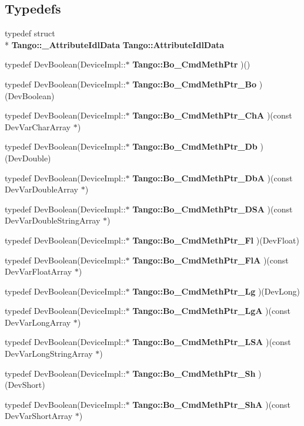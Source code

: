 \subsection*{Typedefs}
\begin{DoxyCompactItemize}
\item 
typedef struct \\*
{\bf Tango\-::\-\_\-\-Attribute\-Idl\-Data} {\bf Tango\-::\-Attribute\-Idl\-Data}
\item 
typedef Dev\-Boolean(Device\-Impl\-::$\ast$ {\bf Tango\-::\-Bo\-\_\-\-Cmd\-Meth\-Ptr} )()
\item 
typedef Dev\-Boolean(Device\-Impl\-::$\ast$ {\bf Tango\-::\-Bo\-\_\-\-Cmd\-Meth\-Ptr\-\_\-\-Bo} )(Dev\-Boolean)
\item 
typedef Dev\-Boolean(Device\-Impl\-::$\ast$ {\bf Tango\-::\-Bo\-\_\-\-Cmd\-Meth\-Ptr\-\_\-\-Ch\-A} )(const Dev\-Var\-Char\-Array $\ast$)
\item 
typedef Dev\-Boolean(Device\-Impl\-::$\ast$ {\bf Tango\-::\-Bo\-\_\-\-Cmd\-Meth\-Ptr\-\_\-\-Db} )(Dev\-Double)
\item 
typedef Dev\-Boolean(Device\-Impl\-::$\ast$ {\bf Tango\-::\-Bo\-\_\-\-Cmd\-Meth\-Ptr\-\_\-\-Db\-A} )(const Dev\-Var\-Double\-Array $\ast$)
\item 
typedef Dev\-Boolean(Device\-Impl\-::$\ast$ {\bf Tango\-::\-Bo\-\_\-\-Cmd\-Meth\-Ptr\-\_\-\-D\-S\-A} )(const Dev\-Var\-Double\-String\-Array $\ast$)
\item 
typedef Dev\-Boolean(Device\-Impl\-::$\ast$ {\bf Tango\-::\-Bo\-\_\-\-Cmd\-Meth\-Ptr\-\_\-\-Fl} )(Dev\-Float)
\item 
typedef Dev\-Boolean(Device\-Impl\-::$\ast$ {\bf Tango\-::\-Bo\-\_\-\-Cmd\-Meth\-Ptr\-\_\-\-Fl\-A} )(const Dev\-Var\-Float\-Array $\ast$)
\item 
typedef Dev\-Boolean(Device\-Impl\-::$\ast$ {\bf Tango\-::\-Bo\-\_\-\-Cmd\-Meth\-Ptr\-\_\-\-Lg} )(Dev\-Long)
\item 
typedef Dev\-Boolean(Device\-Impl\-::$\ast$ {\bf Tango\-::\-Bo\-\_\-\-Cmd\-Meth\-Ptr\-\_\-\-Lg\-A} )(const Dev\-Var\-Long\-Array $\ast$)
\item 
typedef Dev\-Boolean(Device\-Impl\-::$\ast$ {\bf Tango\-::\-Bo\-\_\-\-Cmd\-Meth\-Ptr\-\_\-\-L\-S\-A} )(const Dev\-Var\-Long\-String\-Array $\ast$)
\item 
typedef Dev\-Boolean(Device\-Impl\-::$\ast$ {\bf Tango\-::\-Bo\-\_\-\-Cmd\-Meth\-Ptr\-\_\-\-Sh} )(Dev\-Short)
\item 
typedef Dev\-Boolean(Device\-Impl\-::$\ast$ {\bf Tango\-::\-Bo\-\_\-\-Cmd\-Meth\-Ptr\-\_\-\-Sh\-A} )(const Dev\-Var\-Short\-Array $\ast$)

\end{DoxyCompactItemize}

